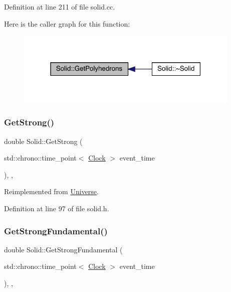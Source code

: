 Definition at line 211 of file solid.\+cc.

Here is the caller graph for this function\+:
\nopagebreak
\begin{figure}[H]
\begin{center}
\leavevmode
\includegraphics[width=304pt]{class_solid_a7006714c19bf8a7b020f42f394e4edc0_icgraph}
\end{center}
\end{figure}
\mbox{\label{class_solid_ae39d0166456b8feaa39547e5a21c9096}} 
\subsubsection{\texorpdfstring{Get\+Strong()}{GetStrong()}}
{\footnotesize\ttfamily double Solid\+::\+Get\+Strong (\begin{DoxyParamCaption}\item[{std\+::chrono\+::time\+\_\+point$<$ \hyperlink{universe_8h_a0ef8d951d1ca5ab3cfaf7ab4c7a6fd80}{Clock} $>$}]{event\+\_\+time }\end{DoxyParamCaption})\hspace{0.3cm}{\ttfamily [inline]}, {\ttfamily [final]}, {\ttfamily [virtual]}}



Reimplemented from \hyperlink{class_universe_acb453ce71da418c5b5617fecede9571b}{Universe}.



Definition at line 97 of file solid.\+h.

\mbox{\label{class_solid_ab3a972354b25ad1bbe8c3f3e7638e24c}} 
\subsubsection{\texorpdfstring{Get\+Strong\+Fundamental()}{GetStrongFundamental()}}
{\footnotesize\ttfamily double Solid\+::\+Get\+Strong\+Fundamental (\begin{DoxyParamCaption}\item[{std\+::chrono\+::time\+\_\+point$<$ \hyperlink{universe_8h_a0ef8d951d1ca5ab3cfaf7ab4c7a6fd80}{Clock} $>$}]{event\+\_\+time }\end{DoxyParamCaption})\hspace{0.3cm}{\ttfamily [inline]}, {\ttfamily [final]}, {\ttfamily [virtual]}}



